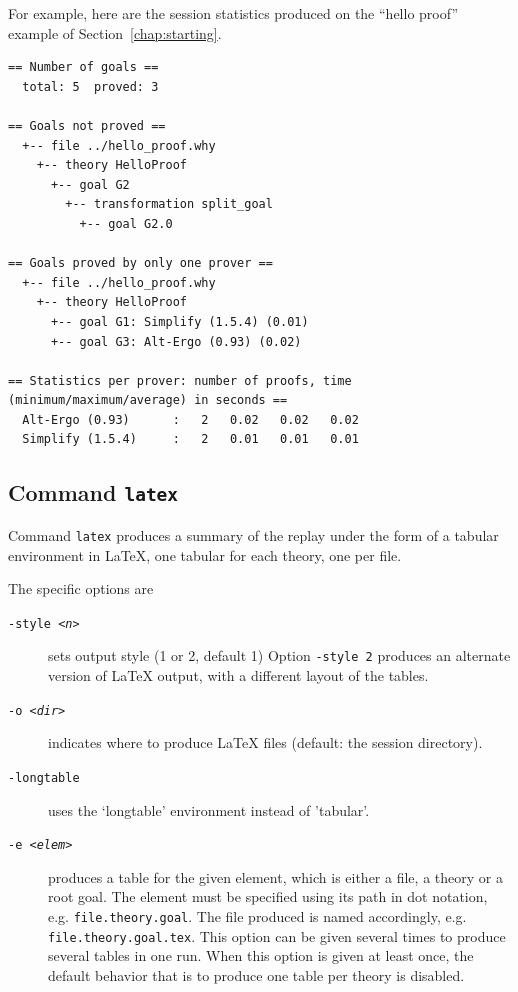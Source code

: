 For example, here are the session statistics produced on the ``hello
proof'' example of Section~\ref{chap:starting}.
{\footnotesize
\begin{verbatim}
== Number of goals ==
  total: 5  proved: 3

== Goals not proved ==
  +-- file ../hello_proof.why
    +-- theory HelloProof
      +-- goal G2
        +-- transformation split_goal
          +-- goal G2.0

== Goals proved by only one prover ==
  +-- file ../hello_proof.why
    +-- theory HelloProof
      +-- goal G1: Simplify (1.5.4) (0.01)
      +-- goal G3: Alt-Ergo (0.93) (0.02)

== Statistics per prover: number of proofs, time (minimum/maximum/average) in seconds ==
  Alt-Ergo (0.93)      :   2   0.02   0.02   0.02
  Simplify (1.5.4)     :   2   0.01   0.01   0.01
\end{verbatim}
}

\subsection{Command \texttt{latex}}

Command \texttt{latex} produces a summary of the replay under the form
of a tabular environment in LaTeX, one tabular for each theory, one
per file.

The specific options are
\begin{description}
\item[\texttt{-style \textsl{<n>}}] sets output style (1 or 2, default 1)
  Option \texttt{-style 2} produces an alternate version of LaTeX
  output, with a different layout of the tables.
\item[\texttt{-o \textsl{<dir>}}] indicates where
  to produce LaTeX files (default: the session directory).
\item[\texttt{-longtable}] uses the `longtable' environment instead of
  'tabular'.
\item[\texttt{-e \textsl{<elem>}}] produces a table for the given element, which is
  either a file, a theory or a root goal. The element must be specified
  using its path in dot notation, e.g. \verb|file.theory.goal|. The
  file produced is named accordingly,
  e.g. \verb|file.theory.goal.tex|.  This option can be given several
  times to produce several tables in one run. When this option is
  given at least once, the default behavior that is to produce one
  table per theory is disabled.
\end{description}

